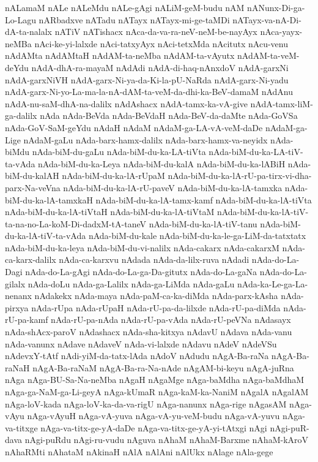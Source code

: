 {nALamaM
nALe
nALeMdu
nALe-gAgi
nALiM-geM-budu
nAM
nANunx-Di-ga-Lo-Lagu
nARbadxve
nATadu
nATayx
nATayx-mi-ge-taMDi
nATayx-va-nA-Di-dA-ta-nalalx
nATiV
nATishacx
nAca-da-va-ra-neV-neM-be-nayAyx
nAca-yayx-neMBa
nAci-ke-yi-lalxde
nAci-tatxyAyx
nAci-tetxMda
nAcitutx
nAcu-venu
nAdAMta
nAdAMtaH
nAdAM-ta-neMba
nAdAM-ta-vAyutx
nAdAM-ta-veM-deYdu
nAdA-dhA-ra-mayaM
nAdAdi
nAdA-di-haq-nAnxdoV
nAdA-garxNi
nAdA-garxNiVH
nAdA-garx-Ni-ya-da-Ki-la-pU-NaRda
nAdA-garx-Ni-yadu
nAdA-garx-Ni-yo-La-ma-la-nA-dAM-ta-veM-da-dhi-ka-BeV-damaM
nAdAnu
nAdA-nu-saM-dhA-na-dalilx
nAdAshacx
nAdA-tamx-ka-vA-give
nAdA-tamx-liM-ga-dalilx
nAda
nAda-BeVda
nAda-BeVdaH
nAda-BeV-da-daMte
nAda-GoVSa
nAda-GoV-SaM-geYdu
nAdaH
nAdaM
nAdaM-ga-LA-vA-veM-daDe
nAdaM-ga-Lige
nAdaM-gaLu
nAda-barx-hamx-dalilx
nAda-barx-hamx-va-neyidx
nAda-biMdu
nAda-biM-du-gaLu
nAda-biM-du-ka-LA-tiVta
nAda-biM-du-ka-LA-tiV-ta-vAda
nAda-biM-du-ka-Leya
nAda-biM-du-kalA
nAda-biM-du-ka-lABiH
nAda-biM-du-kalAH
nAda-biM-du-ka-lA-rUpaM
nAda-biM-du-ka-lA-rU-pa-tirx-vi-dha-parx-Na-veVna
nAda-biM-du-ka-lA-rU-paveV
nAda-biM-du-ka-lA-tamxka
nAda-biM-du-ka-lA-tamxkaH
nAda-biM-du-ka-lA-tamx-kamf
nAda-biM-du-ka-lA-tiVta
nAda-biM-du-ka-lA-tiVtaH
nAda-biM-du-ka-lA-tiVtaM
nAda-biM-du-ka-lA-tiV-ta-na-no-La-koM-Di-dadxM-tA-taneV
nAda-biM-du-ka-lA-tiV-tanu
nAda-biM-du-ka-lA-tiV-ta-vAda
nAda-biM-du-kale
nAda-biM-du-ka-le-ga-LiM-da-tatxtatx
nAda-biM-du-ka-leya
nAda-biM-du-vi-nalilx
nAda-cakarx
nAda-cakarxM
nAda-ca-karx-dalilx
nAda-ca-karxvu
nAdada
nAda-da-lilx-ruva
nAdadi
nAda-do-La-Dagi
nAda-do-La-gAgi
nAda-do-La-ga-Da-gitutx
nAda-do-La-gaNa
nAda-do-La-gilalx
nAda-doLu
nAda-ga-Lalilx
nAda-ga-LiMda
nAda-gaLu
nAda-ka-Le-ga-La-nenanx
nAdakekx
nAda-maya
nAda-paM-ca-ka-diMda
nAda-parx-kAsha
nAda-pirxya
nAda-rUpa
nAda-rUpaH
nAda-rU-pa-da-lilxde
nAda-rU-pa-diMda
nAda-rU-pa-kamf
nAda-rU-pa-nAda
nAda-rU-pa-vAda
nAda-rU-peVNa
nAdasayx
nAda-shAcx-paroV
nAdashacx
nAda-sha-kitxya
nAdavU
nAdava
nAda-vanu
nAda-vanunx
nAdave
nAdaveV
nAda-vi-lalxde
nAdavu
nAdeV
nAdeVSu
nAdevxY-tAtf
nAdi-yiM-da-tatx-lAda
nAdoV
nAdudu
nAgA-Ba-raNa
nAgA-Ba-raNaH
nAgA-Ba-raNaM
nAgA-Ba-ra-Na-nAde
nAgAM-bi-keyu
nAgA-juRna
nAga
nAga-BU-Sa-Na-neMba
nAgaH
nAgaMge
nAga-baMdha
nAga-baMdhaM
nAga-ga-NaM-ga-Li-geyA
nAga-kUmaR
nAga-kaM-ka-NaniM
nAgalA
nAgalAM
nAga-loV-kada
nAga-loV-ka-da-va-rigU
nAga-nanunx
nAga-rige
nAgasAM
nAga-vAyu
nAga-vAyuH
nAga-vA-yuva
nAga-vA-yu-veM-budu
nAga-vA-yuvu
nAga-va-titxge
nAga-va-titx-ge-yA-daDe
nAga-va-titx-ge-yA-yi-tAtxgi
nAgi
nAgi-puR-dava
nAgi-puRdu
nAgi-ru-vudu
nAguva
nAhaM
nAhaM-Barxme
nAhaM-kAroV
nAhaRMti
nAhataM
nAkinaH
nAlA
nAlAni
nAlUkx
nAlage
nAla-gege
}
